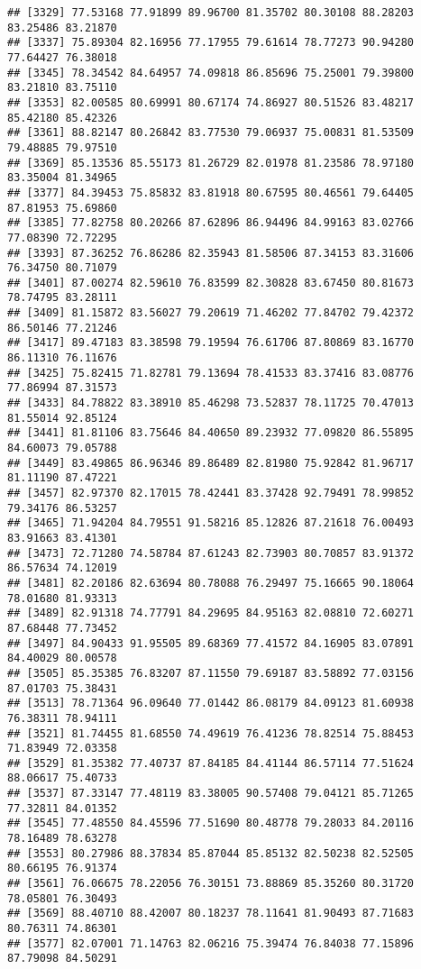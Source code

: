\documentclass[
]{article}
\begin{document}
\begin{verbatim}
## [3329] 77.53168 77.91899 89.96700 81.35702 80.30108 88.28203 83.25486 83.21870
## [3337] 75.89304 82.16956 77.17955 79.61614 78.77273 90.94280 77.64427 76.38018
## [3345] 78.34542 84.64957 74.09818 86.85696 75.25001 79.39800 83.21810 83.75110
## [3353] 82.00585 80.69991 80.67174 74.86927 80.51526 83.48217 85.42180 85.42326
## [3361] 88.82147 80.26842 83.77530 79.06937 75.00831 81.53509 79.48885 79.97510
## [3369] 85.13536 85.55173 81.26729 82.01978 81.23586 78.97180 83.35004 81.34965
## [3377] 84.39453 75.85832 83.81918 80.67595 80.46561 79.64405 87.81953 75.69860
## [3385] 77.82758 80.20266 87.62896 86.94496 84.99163 83.02766 77.08390 72.72295
## [3393] 87.36252 76.86286 82.35943 81.58506 87.34153 83.31606 76.34750 80.71079
## [3401] 87.00274 82.59610 76.83599 82.30828 83.67450 80.81673 78.74795 83.28111
## [3409] 81.15872 83.56027 79.20619 71.46202 77.84702 79.42372 86.50146 77.21246
## [3417] 89.47183 83.38598 79.19594 76.61706 87.80869 83.16770 86.11310 76.11676
## [3425] 75.82415 71.82781 79.13694 78.41533 83.37416 83.08776 77.86994 87.31573
## [3433] 84.78822 83.38910 85.46298 73.52837 78.11725 70.47013 81.55014 92.85124
## [3441] 81.81106 83.75646 84.40650 89.23932 77.09820 86.55895 84.60073 79.05788
## [3449] 83.49865 86.96346 89.86489 82.81980 75.92842 81.96717 81.11190 87.47221
## [3457] 82.97370 82.17015 78.42441 83.37428 92.79491 78.99852 79.34176 86.53257
## [3465] 71.94204 84.79551 91.58216 85.12826 87.21618 76.00493 83.91663 83.41301
## [3473] 72.71280 74.58784 87.61243 82.73903 80.70857 83.91372 86.57634 74.12019
## [3481] 82.20186 82.63694 80.78088 76.29497 75.16665 90.18064 78.01680 81.93313
## [3489] 82.91318 74.77791 84.29695 84.95163 82.08810 72.60271 87.68448 77.73452
## [3497] 84.90433 91.95505 89.68369 77.41572 84.16905 83.07891 84.40029 80.00578
## [3505] 85.35385 76.83207 87.11550 79.69187 83.58892 77.03156 87.01703 75.38431
## [3513] 78.71364 96.09640 77.01442 86.08179 84.09123 81.60938 76.38311 78.94111
## [3521] 81.74455 81.68550 74.49619 76.41236 78.82514 75.88453 71.83949 72.03358
## [3529] 81.35382 77.40737 87.84185 84.41144 86.57114 77.51624 88.06617 75.40733
## [3537] 87.33147 77.48119 83.38005 90.57408 79.04121 85.71265 77.32811 84.01352
## [3545] 77.48550 84.45596 77.51690 80.48778 79.28033 84.20116 78.16489 78.63278
## [3553] 80.27986 88.37834 85.87044 85.85132 82.50238 82.52505 80.66195 76.91374
## [3561] 76.06675 78.22056 76.30151 73.88869 85.35260 80.31720 78.05801 76.30493
## [3569] 88.40710 88.42007 80.18237 78.11641 81.90493 87.71683 80.76311 74.86301
## [3577] 82.07001 71.14763 82.06216 75.39474 76.84038 77.15896 87.79098 84.50291

\end{verbatim}
\end{document}
